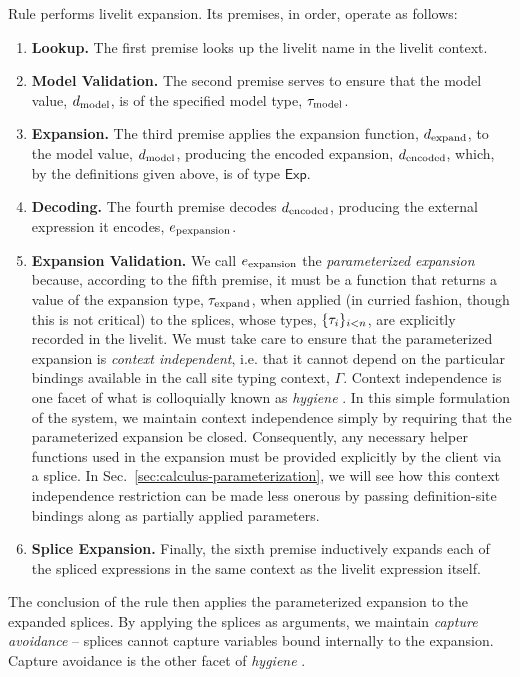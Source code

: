 Rule  performs livelit expansion. Its premises, in order, operate as follows:
\begin{enumerate}
    \item \textbf{Lookup.} The first premise looks up the livelit name in the livelit context.
    \item \textbf{Model Validation.} The second premise serves to ensure that the model value, $d_\text{model}$, is of the 
    specified model type, $\tau_\text{model}$.
    \item \textbf{Expansion.} The third premise applies the expansion function, $d_\text{expand}$, to the model value, $d_\text{model}$, 
    producing the encoded expansion, $d_\text{encoded}$, which, by the definitions given above, is of type $\mathsf{Exp}$.
    \item \textbf{Decoding.} The fourth premise decodes $d_\text{encoded}$, producing the external expression it encodes, $e_\text{pexpansion}$.
    \item \textbf{Expansion Validation.} We call $e_\text{expansion}$ the \emph{parameterized expansion} because, according to the fifth premise,
    it must be a function that returns a value of the expansion type, $\tau_\text{expand}$, when applied (in curried fashion, though this is not critical)
    to the splices, whose types, $\{\tau_i\}_{i < n}$, are explicitly recorded in the livelit.
    We must take care to ensure that the parameterized expansion is \emph{context independent}, 
    i.e. that it cannot depend on the particular bindings available in the call site typing context, $\Gamma$. 
    Context independence is one facet of what is colloquially known as \emph{hygiene} \cite{TLMs}.
    In this simple formulation of the system, we maintain context independence simply by 
    requiring that the parameterized expansion be 
    closed. Consequently, any necessary helper functions used in the expansion must be provided explicitly by the client 
    via a splice. In Sec.~\ref{sec:calculus-parameterization}, we will see how this context independence 
    restriction can be made 
    less onerous by passing definition-site bindings along as partially applied parameters.
    \item \textbf{Splice Expansion.} Finally, the sixth premise inductively expands each of the spliced expressions in the same context as the livelit
    expression itself.
\end{enumerate}
The conclusion of the rule then applies the parameterized expansion to the expanded splices. 
By applying the splices as arguments, we maintain \emph{capture avoidance} -- splices cannot capture variables
bound internally to the expansion. Capture avoidance is the other facet of \emph{hygiene} \cite{TLMs}.

